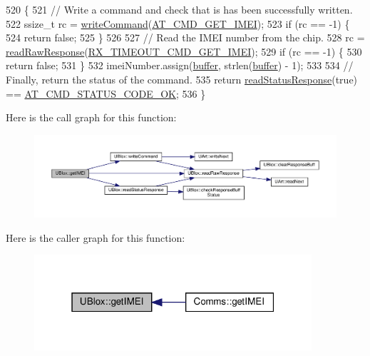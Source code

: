 \begin{DoxyCode}
520 \{
521     \textcolor{comment}{// Write a command and check that is has been successfully written.}
522     ssize\_t rc = \hyperlink{class_u_blox_af604d1897a66192bf1c2a11997f2634d}{writeCommand}(\hyperlink{_u_blox_8cpp_a8589a2182dac88d0193767c584d3fffb}{AT\_CMD\_GET\_IMEI});
523     \textcolor{keywordflow}{if} (rc == -1) \{
524         \textcolor{keywordflow}{return} \textcolor{keyword}{false};
525     \}
526 
527     \textcolor{comment}{// Read the IMEI number from the chip.}
528     rc = \hyperlink{class_u_blox_ab4a7ab4b8922d91e23f273ae160c1bed}{readRawResponse}(\hyperlink{_u_blox_8cpp_aad2fc838c573824893c8fc8893d3e14f}{RX\_TIMEOUT\_CMD\_GET\_IMEI});
529     \textcolor{keywordflow}{if} (rc == -1) \{
530         \textcolor{keywordflow}{return} \textcolor{keyword}{false};
531     \}
532     imeiNumber.assign(\hyperlink{class_u_blox_a6ca4b90f3dc4e856181dce1ebda6f82c}{buffer}, strlen(\hyperlink{class_u_blox_a6ca4b90f3dc4e856181dce1ebda6f82c}{buffer}) - 1);
533 
534     \textcolor{comment}{// Finally, return the status of the command.}
535     \textcolor{keywordflow}{return} \hyperlink{class_u_blox_a4eaca5b1b1c4b5b6f6164b220dd43e0b}{readStatusResponse}(\textcolor{keyword}{true}) == \hyperlink{_u_blox_8cpp_a6ebc1682eb6b9964fccb4a61688ff307}{AT\_CMD\_STATUS\_CODE\_OK};
536 \}
\end{DoxyCode}
Here is the call graph for this function\+:
\nopagebreak
\begin{figure}[H]
\begin{center}
\leavevmode
\includegraphics[width=350pt]{da/df6/class_u_blox_ade30654ab2eab43d322dc6b516866401_cgraph}
\end{center}
\end{figure}
Here is the caller graph for this function\+:
\nopagebreak
\begin{figure}[H]
\begin{center}
\leavevmode
\includegraphics[width=292pt]{da/df6/class_u_blox_ade30654ab2eab43d322dc6b516866401_icgraph}
\end{center}
\end{figure}
\mbox{\label{class_u_blox_a2443d175bbf55a4f4facc5d8a99d2723}} 
